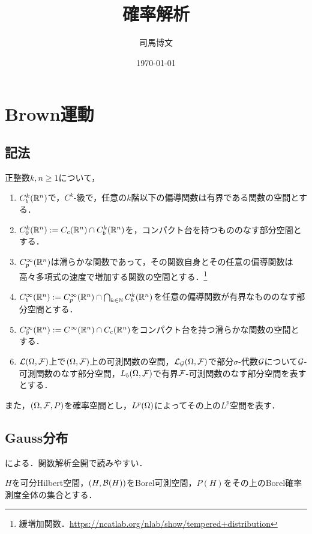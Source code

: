 \documentclass[uplatex,dvipdfmx]{jsreport}
\title{確率解析}
\author{司馬博文}
\date{\today}
\begin{document}
\tableofcontents

\chapter{Brown運動}



\section{記法}

\begin{notation}
    正整数$k,n\ge1$について，
    \begin{enumerate}
        \item $C_b^k(\mathbb{R}^n)$で，$C^k$-級で，任意の$k$階以下の偏導関数は有界である関数の空間とする．
        \item $C_0^k(\mathbb{R}^n):=C_c(\mathbb{R}^n)\cap C_b^k(\mathbb{R}^n)$を，コンパクト台を持つもののなす部分空間とする．
        \item $C_p^\infty(\mathbb{R}^n)$は滑らかな関数であって，その関数自身とその任意の偏導関数は高々多項式の速度で増加する関数の空間とする．\footnote{緩増加関数．\url{https://ncatlab.org/nlab/show/tempered+distribution}}
        \item $C_b^\infty(\mathbb{R}^n):=C_p^\infty(\mathbb{R}^n)\cap\bigcap_{k\in\mathbb{N}}C_b^k(\mathbb{R}^n)$を任意の偏導関数が有界なもののなす部分空間とする．
        \item $C_0^\infty(\mathbb{R}^n):=C^\infty(\mathbb{R}^n)\cap C_c(\mathbb{R}^n)$をコンパクト台を持つ滑らかな関数の空間とする．
        \item $\mathcal{L}(\Omega,\mathcal{F})$上で$(\Omega,\mathcal{F})$上の可測関数の空間，$\mathcal{L}_{\mathcal{G}}(\Omega,\mathcal{F})$で部分$\sigma$-代数$\mathcal{G}$について$\mathcal{G}$-可測関数のなす部分空間，$L_b(\Omega,\mathcal{F})$で有界$\mathcal{F}$-可測関数のなす部分空間を表すとする．
    \end{enumerate}
    また，$(\Omega,\mathcal{F},P)$を確率空間とし，$L^p(\Omega)$によってその上の$L^p$空間を表す．
\end{notation}

\section{Gauss分布}

\begin{tcolorbox}[colframe=ForestGreen, colback=ForestGreen!10!white,breakable,colbacktitle=ForestGreen!40!white,coltitle=black,fonttitle=\bfseries\sffamily,
title=]
    \cite{Prato}による．関数解析全開で読みやすい．
\end{tcolorbox}

\begin{notation}
    $H$を可分Hilbert空間，$(H,\mathcal{B}(H))$をBorel可測空間，$P(H)$をその上のBorel確率測度全体の集合とする．
\end{notation}
\end{document}
